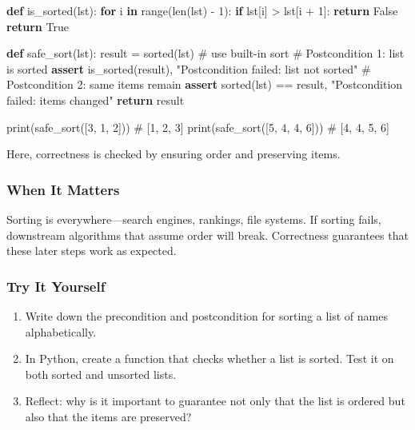 \documentclass[
  letterpaper,
  DIV=11,
  numbers=noendperiod]{scrreprt}
\newenvironment{Shaded}{\begin{snugshade}}{\end{snugshade}}
\newcommand{\BuiltInTok}[1]{\textcolor[rgb]{0.00,0.23,0.31}{#1}}
\newcommand{\CommentTok}[1]{\textcolor[rgb]{0.37,0.37,0.37}{#1}}
\newcommand{\ControlFlowTok}[1]{\textcolor[rgb]{0.00,0.23,0.31}{\textbf{#1}}}
\newcommand{\DecValTok}[1]{\textcolor[rgb]{0.68,0.00,0.00}{#1}}
\newcommand{\KeywordTok}[1]{\textcolor[rgb]{0.00,0.23,0.31}{\textbf{#1}}}
\newcommand{\NormalTok}[1]{\textcolor[rgb]{0.00,0.23,0.31}{#1}}
\newcommand{\OperatorTok}[1]{\textcolor[rgb]{0.37,0.37,0.37}{#1}}
\newcommand{\StringTok}[1]{\textcolor[rgb]{0.13,0.47,0.30}{#1}}
\newcommand{\VariableTok}[1]{\textcolor[rgb]{0.07,0.07,0.07}{#1}}
\providecommand{\tightlist}{%
  \setlength{\itemsep}{0pt}\setlength{\parskip}{0pt}}
\begin{document}
\begin{Shaded}
\begin{Highlighting}[]
\KeywordTok{def}\NormalTok{ is\_sorted(lst):}
    \ControlFlowTok{for}\NormalTok{ i }\KeywordTok{in} \BuiltInTok{range}\NormalTok{(}\BuiltInTok{len}\NormalTok{(lst) }\OperatorTok{{-}} \DecValTok{1}\NormalTok{):}
        \ControlFlowTok{if}\NormalTok{ lst[i] }\OperatorTok{\textgreater{}}\NormalTok{ lst[i }\OperatorTok{+} \DecValTok{1}\NormalTok{]:}
            \ControlFlowTok{return} \VariableTok{False}
    \ControlFlowTok{return} \VariableTok{True}

\KeywordTok{def}\NormalTok{ safe\_sort(lst):}
\NormalTok{    result }\OperatorTok{=} \BuiltInTok{sorted}\NormalTok{(lst)   }\CommentTok{\# use built{-}in sort}
    \CommentTok{\# Postcondition 1: list is sorted}
    \ControlFlowTok{assert}\NormalTok{ is\_sorted(result), }\StringTok{"Postcondition failed: list not sorted"}
    \CommentTok{\# Postcondition 2: same items remain}
    \ControlFlowTok{assert} \BuiltInTok{sorted}\NormalTok{(lst) }\OperatorTok{==}\NormalTok{ result, }\StringTok{"Postcondition failed: items changed"}
    \ControlFlowTok{return}\NormalTok{ result}

\BuiltInTok{print}\NormalTok{(safe\_sort([}\DecValTok{3}\NormalTok{, }\DecValTok{1}\NormalTok{, }\DecValTok{2}\NormalTok{]))   }\CommentTok{\# [1, 2, 3]}
\BuiltInTok{print}\NormalTok{(safe\_sort([}\DecValTok{5}\NormalTok{, }\DecValTok{4}\NormalTok{, }\DecValTok{4}\NormalTok{, }\DecValTok{6}\NormalTok{])) }\CommentTok{\# [4, 4, 5, 6]}
\end{Highlighting}
\end{Shaded}

Here, correctness is checked by ensuring order and preserving items.

\subsubsection{When It Matters}\label{when-it-matters-62}

Sorting is everywhere---search engines, rankings, file systems. If
sorting fails, downstream algorithms that assume order will break.
Correctness guarantees that these later steps work as expected.

\subsubsection{Try It Yourself}\label{try-it-yourself-64}

\begin{enumerate}
\def\labelenumi{\arabic{enumi}.}
\tightlist
\item
  Write down the precondition and postcondition for sorting a list of
  names alphabetically.
\item
  In Python, create a function that checks whether a list is sorted.
  Test it on both sorted and unsorted lists.
\item
  Reflect: why is it important to guarantee not only that the list is
  ordered but also that the items are preserved?
\end{enumerate}
\end{document}
